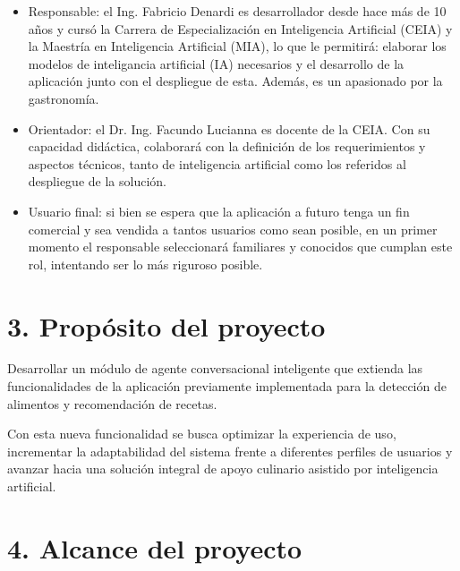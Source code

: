 \documentclass[
11pt, %
]{charter}
\begin{document}
\begin{itemize}
	\item Responsable: el Ing. Fabricio Denardi es desarrollador desde hace más de 10 años y cursó la Carrera de Especialización en Inteligencia Artificial (CEIA) y la Maestría en Inteligencia Artificial (MIA), lo que le permitirá: elaborar los modelos de inteligancia artificial (IA) necesarios y el desarrollo de la aplicación junto con el despliegue de esta. Además, es un apasionado por la gastronomía.
	\item Orientador: el Dr. Ing. Facundo Lucianna es docente de la CEIA. Con su capacidad didáctica, colaborará con la definición de los requerimientos y aspectos técnicos, tanto de inteligencia artificial como los referidos al despliegue de la solución.
	\item Usuario final: si bien se espera que la aplicación a futuro tenga un fin comercial y sea vendida a tantos usuarios como sean posible, en un primer momento el responsable seleccionará familiares y conocidos que cumplan este rol, intentando ser lo más riguroso posible.
\end{itemize}


\section{3. Propósito del proyecto}
\label{sec:proposito}

Desarrollar un módulo de agente conversacional inteligente que extienda las funcionalidades de la aplicación previamente implementada para la detección de alimentos y recomendación de recetas. 

Con esta nueva funcionalidad se busca optimizar la experiencia de uso, incrementar la adaptabilidad del sistema frente a diferentes perfiles de usuarios y avanzar hacia una solución integral de apoyo culinario asistido por inteligencia artificial.

\section{4. Alcance del proyecto}
\label{sec:alcance}
\end{document}
